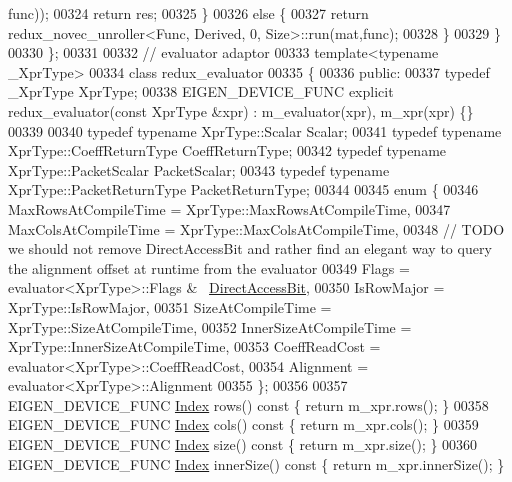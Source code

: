 \begin{DoxyCode}
      func));
00324       \textcolor{keywordflow}{return} res;
00325     \}
00326     \textcolor{keywordflow}{else} \{
00327       \textcolor{keywordflow}{return} redux\_novec\_unroller<Func, Derived, 0, Size>::run(mat,func);
00328     \}
00329   \}
00330 \};
00331 
00332 \textcolor{comment}{// evaluator adaptor}
00333 \textcolor{keyword}{template}<\textcolor{keyword}{typename} \_XprType>
00334 \textcolor{keyword}{class }redux\_evaluator
00335 \{
00336 \textcolor{keyword}{public}:
00337   \textcolor{keyword}{typedef} \_XprType XprType;
00338   EIGEN\_DEVICE\_FUNC \textcolor{keyword}{explicit} redux\_evaluator(\textcolor{keyword}{const} XprType &xpr) : m\_evaluator(xpr), m\_xpr(xpr) \{\}
00339   
00340   \textcolor{keyword}{typedef} \textcolor{keyword}{typename} XprType::Scalar Scalar;
00341   \textcolor{keyword}{typedef} \textcolor{keyword}{typename} XprType::CoeffReturnType CoeffReturnType;
00342   \textcolor{keyword}{typedef} \textcolor{keyword}{typename} XprType::PacketScalar PacketScalar;
00343   \textcolor{keyword}{typedef} \textcolor{keyword}{typename} XprType::PacketReturnType PacketReturnType;
00344   
00345   \textcolor{keyword}{enum} \{
00346     MaxRowsAtCompileTime = XprType::MaxRowsAtCompileTime,
00347     MaxColsAtCompileTime = XprType::MaxColsAtCompileTime,
00348     \textcolor{comment}{// TODO we should not remove DirectAccessBit and rather find an elegant way to query the alignment
       offset at runtime from the evaluator}
00349     Flags = evaluator<XprType>::Flags & ~\hyperlink{group__flags_gabf1e9d0516a933445a4c307ad8f14915}{DirectAccessBit},
00350     IsRowMajor = XprType::IsRowMajor,
00351     SizeAtCompileTime = XprType::SizeAtCompileTime,
00352     InnerSizeAtCompileTime = XprType::InnerSizeAtCompileTime,
00353     CoeffReadCost = evaluator<XprType>::CoeffReadCost,
00354     Alignment = evaluator<XprType>::Alignment
00355   \};
00356   
00357   EIGEN\_DEVICE\_FUNC \hyperlink{namespace_eigen_a62e77e0933482dafde8fe197d9a2cfde}{Index} rows()\textcolor{keyword}{ const }\{ \textcolor{keywordflow}{return} m\_xpr.rows(); \}
00358   EIGEN\_DEVICE\_FUNC \hyperlink{namespace_eigen_a62e77e0933482dafde8fe197d9a2cfde}{Index} cols()\textcolor{keyword}{ const }\{ \textcolor{keywordflow}{return} m\_xpr.cols(); \}
00359   EIGEN\_DEVICE\_FUNC \hyperlink{namespace_eigen_a62e77e0933482dafde8fe197d9a2cfde}{Index} size()\textcolor{keyword}{ const }\{ \textcolor{keywordflow}{return} m\_xpr.size(); \}
00360   EIGEN\_DEVICE\_FUNC \hyperlink{namespace_eigen_a62e77e0933482dafde8fe197d9a2cfde}{Index} innerSize()\textcolor{keyword}{ const }\{ \textcolor{keywordflow}{return} m\_xpr.innerSize(); \}

\end{DoxyCode}
